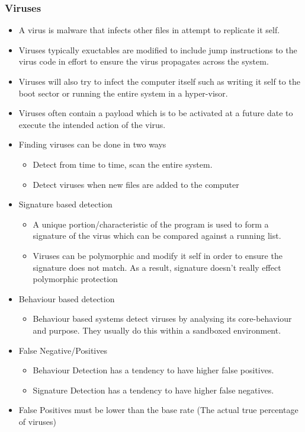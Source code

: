 \documentclass[twoside]{article}
\begin{document}
\subsubsection{Viruses}
\begin{itemize}
\item A virus is malware that infects other files in attempt to replicate it self. 
\item Viruses typically exuctables are modified to include jump instructions to the virus code in effort to ensure the virus propagates across the system.
\item Viruses will also try to infect the computer itself such as writing it self to the boot sector or running the entire system in a hyper-visor.
\item Viruses often contain a payload which is to be activated at a future date to execute the intended action of the virus. 
\item Finding viruses can be done in two ways
\begin{itemize}
\item Detect from time to time, scan the entire system. 
\item Detect viruses when new files are added to the computer
\end{itemize}
\item Signature based detection 
\begin{itemize}
\item A unique portion/characteristic of the program is used to form a signature of the virus which can be compared against a running list. 
\item Viruses can be polymorphic and modify it self in order to ensure the signature does not match. As a result, signature doesn't really effect polymorphic protection
\end{itemize}
\item Behaviour based detection
\begin{itemize}
\item Behaviour based systems detect viruses by analysing its core-behaviour and purpose. They usually do this within a sandboxed environment. 
\end{itemize}
\item False Negative/Positives
\begin{itemize}
\item Behaviour Detection has a tendency to have higher false positives.  
\item Signature Detection has a tendency to have higher false negatives.
\end{itemize}
\item False Positives must be lower than the base rate (The actual true percentage of viruses)
\end{itemize}
\end{document}
